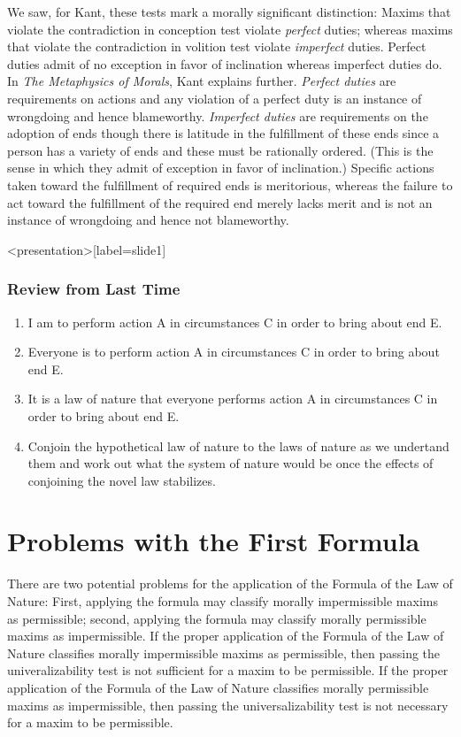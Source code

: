 We saw, for Kant, these tests mark a morally significant distinction: Maxims that violate the contradiction in conception test violate \emph{perfect} duties; whereas maxims that violate the contradiction in volition test violate \emph{imperfect} duties. Perfect duties admit of no exception in favor of inclination whereas imperfect duties do. In \emph{The Metaphysics of Morals}, Kant explains further. \emph{Perfect duties} are requirements on actions and any violation of a perfect duty is an instance of wrongdoing and hence blameworthy. \emph{Imperfect duties} are requirements on the adoption of ends though there is latitude in the fulfillment of these ends since a person has a variety of ends and these must be rationally ordered. (This is the sense in which they admit of exception in favor of inclination.) Specific actions taken toward the fulfillment of required ends is meritorious, whereas the failure to act toward the fulfillment of the required end merely lacks merit and is not an instance of wrongdoing and hence not blameworthy. \change

\begin{frame}<presentation>[label=slide1]
    \frametitle{Review from Last Time}
        \begin{enumerate}
            \item I am to perform action A in circumstances C in order to bring about end E.
            \item Everyone is to perform action A in circumstances C in order to bring about end E.
            \item It is a law of nature that everyone performs action A in circumstances C in order to bring about end E.
            \item  Conjoin the hypothetical law of nature to the laws of nature as we undertand them and work out what the system of nature would be once the effects of conjoining the novel law stabilizes.
        \end{enumerate}
\end{frame}


\section{Problems with the First Formula}\label{sec:problems_with_the_first_formula} %

There are two potential problems for the application of the Formula of the Law of Nature: First, applying the formula may classify morally impermissible maxims as permissible; second, applying the formula may classify morally permissible maxims as impermissible. If the proper application of the Formula of the Law of Nature classifies morally impermissible maxims as permissible, then passing the univeralizability test is not sufficient for a maxim to be permissible. If the proper application of the Formula of the Law of Nature classifies morally permissible maxims as impermissible, then passing the universalizability test is not necessary for a maxim to be permissible. \change

